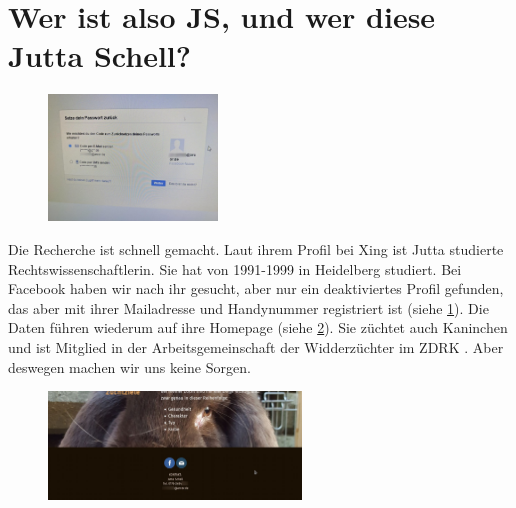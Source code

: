 \section{Wer ist also JS, und wer diese Jutta Schell?}
\begin{figure}\centering \vspace{-10pt}
    \includegraphics[width=0.4\textwidth]{images/image--007.jpg}
    \caption{}\label{image:7} \vspace{-20pt}
\end{figure}
Die Recherche ist schnell gemacht. Laut ihrem Profil bei
Xing \autocite{8} ist Jutta studierte Rechtswissenschaftlerin. Sie hat
von 1991-1999 in Heidelberg studiert.  Bei Facebook haben wir nach ihr gesucht, aber nur ein deaktiviertes Profil \autocite{9} \autocite{10} gefunden, das aber mit ihrer Mailadresse und Handynummer registriert ist (siehe \cref{image:7}). Die Daten führen wiederum auf ihre Homepage (siehe \cref{image:11}). Sie züchtet auch Kaninchen \autocite{11} und ist Mitglied in der Arbeitsgemeinschaft der Widderzüchter im ZDRK \autocite{12}. Aber deswegen machen wir uns keine Sorgen.
\begin{figure}[hbt!]\centering
  \includegraphics[width=0.6\textwidth]{images/image--011.jpg}
  \caption{}
  \label{image:11}
\end{figure}

